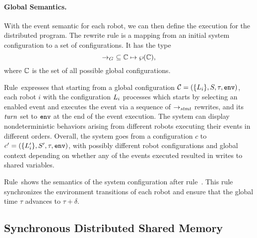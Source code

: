 \paragraph{Global Semantics.}

With the event semantic for each robot, we can then define the execution for the distributed \lgname program.
The rewrite rule is a mapping from an initial system configuration to a set of configurations.
It has the type
\[
\rightarrow_G\ \subseteq \mathbb{C} \mapsto \wp(\mathbb{C}),
\]
where $\mathbb{C}$ is the set of all possible global configurations.

Rule~\ProgTransRule expresses that starting from a global configuration $\mathcal{C} = (\{L_{i}\}, S, \tau, \mathtt{env})$,
each robot $i$ with the configuration $L_{i}$ processes which starts by selecting an enabled event and executes the event via a sequence of $\rightarrow_\mathit{stmt}$ rewrites,
and its $\mathit{turn}$ set to $\mathtt{env}$ at the end of the event execution.
The system can display nondeterministic behaviors arising from different robots executing their events in different orders.
Overall, the system goes from a configuration $c$ to $c^{\prime}= (\{L_{i}^\prime\}, S^{\prime}, \tau, \mathtt{env})$,
with possibly different robot configurations and global context depending on
whether any of the events executed resulted in writes to shared variables.


Rule~\EnvTransRule shows the semantics of the system configuration after rule~\ProgTransRule.
This rule synchronizes the environment transitions of each robot and
ensure that the global time $\tau$ advances to $\tau + \delta$.


\subsection{Synchronous Distributed Shared Memory}
\label{sec:memory}


%

